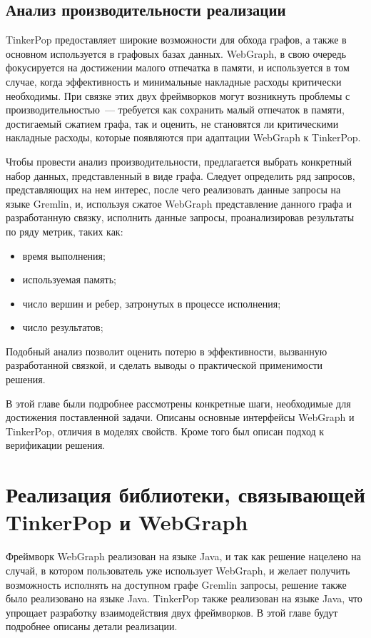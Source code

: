 \documentclass[times,specification,annotation]{itmo-student-thesis}
\begin{document}
\section{Анализ производительности реализации}

TinkerPop предоставляет широкие возможности для обхода графов, а также в основном используется в графовых базах данных. WebGraph, в свою очередь фокусируется на достижении малого отпечатка в памяти, и используется в том случае, когда эффективность и минимальные накладные расходы критически необходимы.
При связке этих двух фреймворков могут возникнуть проблемы с производительностью~--- требуется как сохранить малый отпечаток в памяти, достигаемый сжатием графа, так и оценить, не становятся ли критическими накладные расходы, которые появляются при адаптации WebGraph к TinkerPop.

Чтобы провести анализ производительности, предлагается выбрать конкретный набор данных, представленный в виде графа. Следует определить ряд запросов, представляющих на нем интерес, после чего реализовать данные запросы на языке Gremlin, и, используя сжатое WebGraph представление данного графа и разработанную связку, исполнить данные запросы, проанализировав результаты по ряду метрик, таких как:

\begin{itemize}
    \item время выполнения;
    \item используемая память;
    \item число вершин и ребер, затронутых в процессе исполнения;
    \item число результатов;
\end{itemize}

Подобный анализ позволит оценить потерю в эффективности, вызванную разработанной связкой, и сделать выводы о практической применимости решения.

\chapterconclusion
В этой главе были подробнее рассмотрены конкретные шаги, необходимые для достижения поставленной задачи. Описаны основные интерфейсы WebGraph и TinkerPop, отличия в моделях свойств. Кроме того был описан подход к верификации решения.

\chapter{Реализация библиотеки, связывающей TinkerPop и WebGraph}

Фреймворк WebGraph реализован на языке Java, и так как решение нацелено на случай, в котором пользователь уже использует WebGraph, и желает получить возможность исполнять на доступном графе Gremlin запросы, решение также было реализовано на языке Java. TinkerPop также реализован на языке Java, что упрощает разработку взаимодействия двух фреймворков. В этой главе будут подробнее описаны детали реализации.
\end{document}
